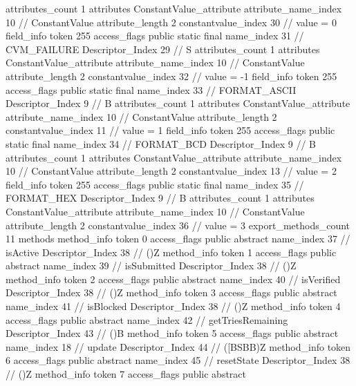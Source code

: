 {{{{{				attributes_count	1
				attributes {
				ConstantValue_attribute {
					attribute_name_index	10		// ConstantValue
					attribute_length	2
					constantvalue_index	30		// value = 0
				}
				}
			}
			field_info {
				token	255
				access_flags	public static final
				name_index	31		// CVM_FAILURE
				Descriptor_Index	29		// S
				attributes_count	1
				attributes {
				ConstantValue_attribute {
					attribute_name_index	10		// ConstantValue
					attribute_length	2
					constantvalue_index	32		// value = -1
				}
				}
			}
			field_info {
				token	255
				access_flags	public static final
				name_index	33		// FORMAT_ASCII
				Descriptor_Index	9		// B
				attributes_count	1
				attributes {
				ConstantValue_attribute {
					attribute_name_index	10		// ConstantValue
					attribute_length	2
					constantvalue_index	11		// value = 1
				}
				}
			}
			field_info {
				token	255
				access_flags	public static final
				name_index	34		// FORMAT_BCD
				Descriptor_Index	9		// B
				attributes_count	1
				attributes {
				ConstantValue_attribute {
					attribute_name_index	10		// ConstantValue
					attribute_length	2
					constantvalue_index	13		// value = 2
				}
				}
			}
			field_info {
				token	255
				access_flags	public static final
				name_index	35		// FORMAT_HEX
				Descriptor_Index	9		// B
				attributes_count	1
				attributes {
				ConstantValue_attribute {
					attribute_name_index	10		// ConstantValue
					attribute_length	2
					constantvalue_index	36		// value = 3
				}
				}
			}
			}
			export_methods_count	11
			methods {
				method_info {
					token	0
					access_flags	public abstract
					name_index	37		// isActive
					Descriptor_Index	38		// ()Z
				}
				method_info {
					token	1
					access_flags	public abstract
					name_index	39		// isSubmitted
					Descriptor_Index	38		// ()Z
				}
				method_info {
					token	2
					access_flags	public abstract
					name_index	40		// isVerified
					Descriptor_Index	38		// ()Z
				}
				method_info {
					token	3
					access_flags	public abstract
					name_index	41		// isBlocked
					Descriptor_Index	38		// ()Z
				}
				method_info {
					token	4
					access_flags	public abstract
					name_index	42		// getTriesRemaining
					Descriptor_Index	43		// ()B
				}
				method_info {
					token	5
					access_flags	public abstract
					name_index	18		// update
					Descriptor_Index	44		// ([BSBB)Z
				}
				method_info {
					token	6
					access_flags	public abstract
					name_index	45		// resetState
					Descriptor_Index	38		// ()Z
				}
				method_info {
					token	7
					access_flags	public abstract
}}}}}
